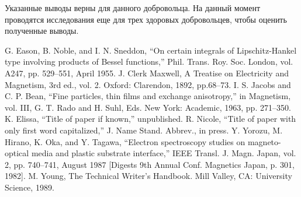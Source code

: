 \documentclass[conference]{IEEEtran}
\begin{document}
Указанные выводы верны для данного добровольца. На данный момент проводятся исследования еще для трех здоровых добровольцев, чтобы оценить полученные выводы.

\begin{thebibliography}{00}
 G. Eason, B. Noble, and I. N. Sneddon, ``On certain integrals of Lipschitz-Hankel type involving products of Bessel functions,'' Phil. Trans. Roy. Soc. London, vol. A247, pp. 529--551, April 1955.
 J. Clerk Maxwell, A Treatise on Electricity and Magnetism, 3rd ed., vol. 2. Oxford: Clarendon, 1892, pp.68--73.
 I. S. Jacobs and C. P. Bean, ``Fine particles, thin films and exchange anisotropy,'' in Magnetism, vol. III, G. T. Rado and H. Suhl, Eds. New York: Academic, 1963, pp. 271--350.
 K. Elissa, ``Title of paper if known,'' unpublished.
 R. Nicole, ``Title of paper with only first word capitalized,'' J. Name Stand. Abbrev., in press.
 Y. Yorozu, M. Hirano, K. Oka, and Y. Tagawa, ``Electron spectroscopy studies on magneto-optical media and plastic substrate interface,'' IEEE Transl. J. Magn. Japan, vol. 2, pp. 740--741, August 1987 [Digests 9th Annual Conf. Magnetics Japan, p. 301, 1982].
 M. Young, The Technical Writer's Handbook. Mill Valley, CA: University Science, 1989.
\end{thebibliography}
\vspace{12pt}
\end{document}
